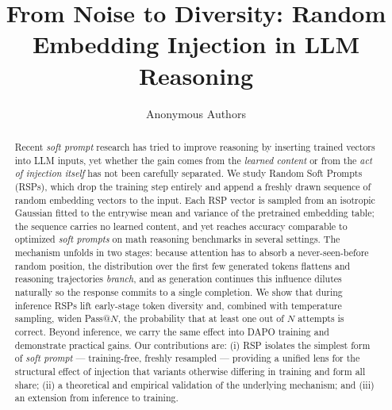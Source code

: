 \documentclass{article}
\title{From Noise to Diversity: Random Embedding Injection in LLM Reasoning}
\author{%
  Anonymous Authors
}
\begin{document}
\maketitle

\begin{abstract}
Recent \textit{soft prompt} research has tried to improve reasoning by inserting trained vectors into LLM inputs, yet whether the gain comes from the \emph{learned content} or from the \emph{act of injection itself} has not been carefully separated. We study Random Soft Prompts (RSPs), which drop the training step entirely and append a freshly drawn sequence of random embedding vectors to the input. Each RSP vector is sampled from an isotropic Gaussian fitted to the entrywise mean and variance of the pretrained embedding table; the sequence carries no learned content, and yet reaches accuracy comparable to optimized \textit{soft prompts} on math reasoning benchmarks in several settings. The mechanism unfolds in two stages: because attention has to absorb a never-seen-before random position, the distribution over the first few generated tokens flattens and reasoning trajectories \emph{branch}, and as generation continues this influence dilutes naturally so the response commits to a single completion. We show that during inference RSPs lift early-stage token diversity and, combined with temperature sampling, widen Pass@$N$, the probability that at least one out of $N$ attempts is correct. Beyond inference, we carry the same effect into DAPO training and demonstrate practical gains. Our contributions are: (i) RSP isolates the simplest form of \textit{soft prompt} --- training-free, freshly resampled --- providing a unified lens for the structural effect of injection that variants otherwise differing in training and form all share; (ii) a theoretical and empirical validation of the underlying mechanism; and (iii) an extension from inference to training.
\end{abstract}








\newpage



\appendix


\newpage

\end{document}
